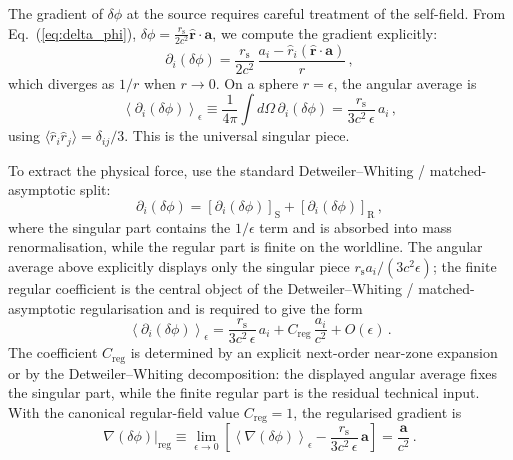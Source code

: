 \documentclass[11pt]{article}
\newcommand{\rs}{r_{\mathrm{s}}}
\begin{document}
The gradient of $\delta\phi$ at the source requires
careful treatment of the self-field.  From Eq.~(\ref{eq:delta_phi}),
$\delta\phi = \frac{\rs}{2c^2}\hat{\mathbf{r}}\cdot\mathbf{a}$,
we compute the gradient explicitly:
\begin{equation}\label{eq:grad_delta_explicit}
  \partial_i(\delta\phi) = \frac{\rs}{2c^2}\,
  \frac{a_i - \hat{r}_i(\hat{\mathbf{r}}\cdot\mathbf{a})}{r}\,,
\end{equation}
which diverges as $1/r$ when $r \to 0$.  On a sphere
$r=\epsilon$, the angular average is
\begin{equation}\label{eq:grad_avg_shell}
  \left\langle \partial_i(\delta\phi)\right\rangle_{\epsilon}
  \equiv \frac{1}{4\pi}\int d\Omega\,\partial_i(\delta\phi)
  = \frac{\rs}{3c^2\,\epsilon}\,a_i\,,
\end{equation}
using $\langle \hat r_i\hat r_j\rangle = \delta_{ij}/3$.
This is the universal singular piece.

To extract the physical force, use the standard
Detweiler--Whiting / matched-asymptotic split:
\begin{equation}\label{eq:grad_split}
  \partial_i(\delta\phi)
  = \left[\partial_i(\delta\phi)\right]_{\mathrm{S}}
  + \left[\partial_i(\delta\phi)\right]_{\mathrm{R}}\,,
\end{equation}
where the singular part contains the $1/\epsilon$ term and is
absorbed into mass renormalisation, while the regular part is
finite on the worldline.  The angular average above explicitly
displays only the singular piece
$\rs a_i/(3c^2\epsilon)$; the finite regular coefficient is
the central object of the Detweiler--Whiting /
matched-asymptotic regularisation and is required to give
the form
\begin{equation}\label{eq:grad_shell_expand}
  \left\langle \partial_i(\delta\phi)\right\rangle_{\epsilon}
  = \frac{\rs}{3c^2\,\epsilon}\,a_i
  + C_{\mathrm{reg}}\,\frac{a_i}{c^2}
  + O(\epsilon)\,.
\end{equation}
The coefficient $C_{\mathrm{reg}}$ is determined by an
explicit next-order near-zone expansion or by the
Detweiler--Whiting decomposition: the displayed angular
average fixes the singular part, while the finite regular
part is the residual technical input.  With the canonical
regular-field value $C_{\mathrm{reg}}=1$, the regularised
gradient is
\begin{equation}\label{eq:grad_delta}
  \nabla(\delta\phi)\bigg|_{\mathrm{reg}}
  \equiv \lim_{\epsilon\to 0}
  \left[\left\langle \nabla(\delta\phi)\right\rangle_{\epsilon}
  - \frac{\rs}{3c^2\,\epsilon}\,\mathbf{a}\right]
  = \frac{\mathbf{a}}{c^2}\,.
\end{equation}
\end{document}
